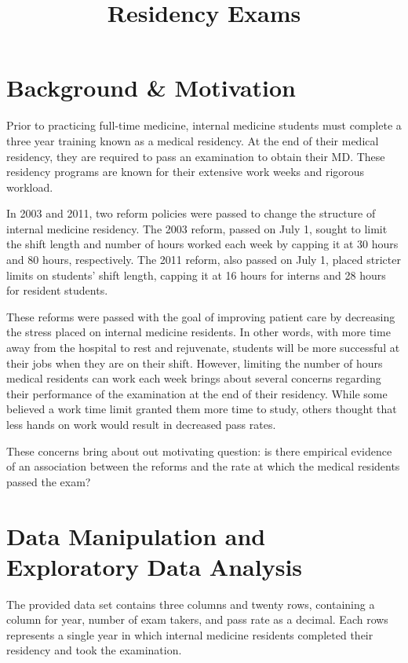 \documentclass[
  letterpaper,
  DIV=11,
  numbers=noendperiod]{scrartcl}
\title{Residency Exams}
\author{}
\date{}
\begin{document}
\maketitle


\section{Background \& Motivation}\label{background-motivation}

Prior to practicing full-time medicine, internal medicine students must
complete a three year training known as a medical residency. At the end
of their medical residency, they are required to pass an examination to
obtain their MD. These residency programs are known for their extensive
work weeks and rigorous workload.

In 2003 and 2011, two reform policies were passed to change the
structure of internal medicine residency. The 2003 reform, passed on
July 1, sought to limit the shift length and number of hours worked each
week by capping it at 30 hours and 80 hours, respectively. The 2011
reform, also passed on July 1, placed stricter limits on students' shift
length, capping it at 16 hours for interns and 28 hours for resident
students.

These reforms were passed with the goal of improving patient care by
decreasing the stress placed on internal medicine residents. In other
words, with more time away from the hospital to rest and rejuvenate,
students will be more successful at their jobs when they are on their
shift. However, limiting the number of hours medical residents can work
each week brings about several concerns regarding their performance of
the examination at the end of their residency. While some believed a
work time limit granted them more time to study, others thought that
less hands on work would result in decreased pass rates.

These concerns bring about out motivating question: is there empirical
evidence of an association between the reforms and the rate at which the
medical residents passed the exam?

\section{Data Manipulation and Exploratory Data
Analysis}\label{data-manipulation-and-exploratory-data-analysis}

The provided data set contains three columns and twenty rows, containing
a column for year, number of exam takers, and pass rate as a decimal.
Each rows represents a single year in which internal medicine residents
completed their residency and took the examination.
\end{document}
